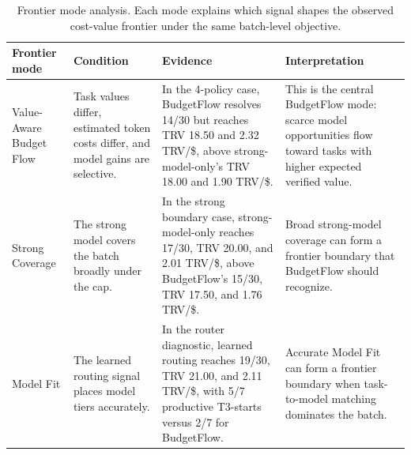\documentclass{article}
\newcommand{\method}{BudgetFlow\xspace}
\newcommand{\trv}{TRV\xspace}
\newcommand{\modelfit}{Model Fit\xspace}
\begin{document}
\begin{table}[t]
\centering
\footnotesize
\begin{tabular}{@{}p{}p{}p{}p{}@{}}
\toprule
Frontier mode & Condition & Evidence & Interpretation \\
\midrule
Value-Aware Budget Flow & Task values differ, estimated token costs differ, and model gains are selective. & In the 4-policy case, \method resolves 14/30 but reaches \trv 18.50 and 2.32 \trv/\$, above strong-model-only's \trv 18.00 and 1.90 \trv/\$. & This is the central \method mode: scarce model opportunities flow toward tasks with higher expected verified value. \\
Strong Coverage & The strong model covers the batch broadly under the cap. & In the strong boundary case, strong-model-only reaches 17/30, \trv 20.00, and 2.01 \trv/\$, above \method's 15/30, \trv 17.50, and 1.76 \trv/\$. & Broad strong-model coverage can form a frontier boundary that \method should recognize. \\
Model Fit & The learned routing signal places model tiers accurately. & In the router diagnostic, learned routing reaches 19/30, \trv 21.00, and 2.11 \trv/\$, with 5/7 productive T3-starts versus 2/7 for \method. & Accurate \modelfit can form a frontier boundary when task-to-model matching dominates the batch. \\
\bottomrule
\end{tabular}
\caption{Frontier mode analysis. Each mode explains which signal shapes the observed cost-value frontier under the same batch-level objective.}
\label{tab:frontier-modes}
\end{table}
\end{document}
